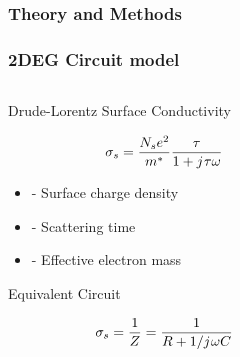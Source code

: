 \documentclass[10pt]{beamer}
\renewcommand{\O}{\omega}  %
\renewcommand{\j}{{j}\mkern1mu} %
\begin{document}
\begin{frame}
    \frametitle{Theory and Methods}
    \frametitle{2DEG Circuit model}
    \begin{columns} %
        \begin{column}{.5\textwidth}
            \begin{minipage}[T][.1\textheight][c]{\linewidth}
                \begin{outline}[itemize]
                    \1 Drude-Lorentz Surface Conductivity
                \end{outline}
                \begin{equation} \nonumber
                    \sigma_s = \frac{N_s e^2}{m^{\ast}}\frac{\tau}{1 + \j \tau \O}
                    \label{eq:Y2deg}
                \end{equation}
                \begin{itemize}
                    \item[] { - Surface charge density}
                    \item[] {\makebox[.3cm][l]{$\tau$} - Scattering time}
                    \item[] { - Effective electron mass}
                \end{itemize}
                \begin{outline}[itemize]
                    \1 Equivalent Circuit
                \end{outline}
                \begin{equation} \nonumber
                    \sigma_s = \frac{1}{Z} = \frac{1}{R + {1}/{\j \O C}}
                    \label{eq:simga_TL}
                \end{equation}
            \end{minipage}
        \end{column}
        \begin{column}{.5\textwidth}
            \begin{figure}

\end{figure}
\end{column}
\end{columns}
\end{frame}
\end{document}

